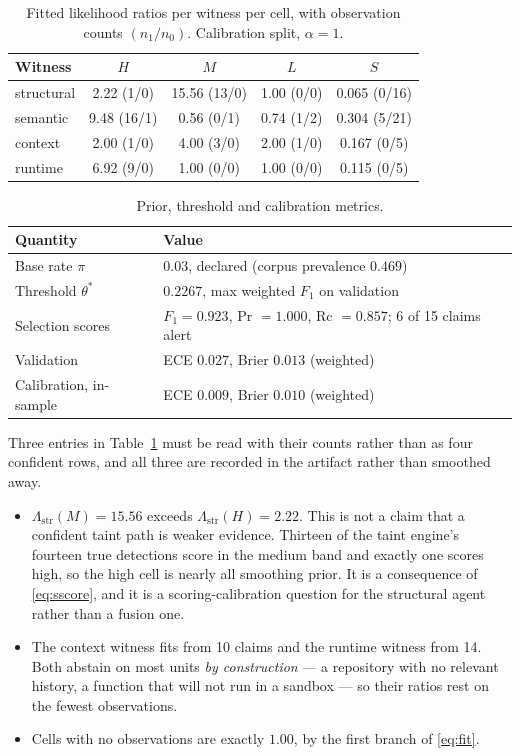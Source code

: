 \documentclass[conference]{IEEEtran}
\newcommand{\LR}{\Lambda}
\begin{document}
\begin{table}[t]
\caption{Fitted likelihood ratios per witness per cell, with observation counts
$(n_1/n_0)$. Calibration split, $\alpha=1$.}
\label{tab:ratios}
\centering
\small
\begin{tabular}{lcccc}
\toprule
Witness & $H$ & $M$ & $L$ & $S$ \\
\midrule
structural & 2.22 \tiny(1/0)  & 15.56 \tiny(13/0) & 1.00 \tiny(0/0) & 0.065 \tiny(0/16) \\
semantic   & 9.48 \tiny(16/1) & 0.56 \tiny(0/1)   & 0.74 \tiny(1/2) & 0.304 \tiny(5/21) \\
context    & 2.00 \tiny(1/0)  & 4.00 \tiny(3/0)   & 2.00 \tiny(1/0) & 0.167 \tiny(0/5)  \\
runtime    & 6.92 \tiny(9/0)  & 1.00 \tiny(0/0)   & 1.00 \tiny(0/0) & 0.115 \tiny(0/5)  \\
\bottomrule
\end{tabular}
\end{table}

\begin{table}[t]
\caption{Prior, threshold and calibration metrics.}
\label{tab:sel}
\centering
\small
\begin{tabular}{lp{2.05in}}
\toprule
Quantity & Value \\
\midrule
Base rate $\pi$        & $0.03$, declared (corpus prevalence $0.469$) \\
Threshold $\theta^{*}$ & $0.2267$, max weighted $F_1$ on validation \\
Selection scores       & $F_1=0.923$, Pr $=1.000$, Rc $=0.857$; 6 of 15 claims alert \\
Validation             & ECE $0.027$, Brier $0.013$ (weighted) \\
Calibration, in-sample & ECE $0.009$, Brier $0.010$ (weighted) \\
\bottomrule
\end{tabular}
\end{table}

Three entries in Table~\ref{tab:ratios} must be read with their counts rather than as four
confident rows, and all three are recorded in the artifact rather than smoothed away.

\begin{itemize}
\item $\LR_{\mathrm{str}}(M)=15.56$ exceeds $\LR_{\mathrm{str}}(H)=2.22$. This is not a claim
that a confident taint path is weaker evidence. Thirteen of the taint engine's fourteen true
detections score in the medium band and exactly one scores high, so the high cell is nearly
all smoothing prior. It is a consequence of \eqref{eq:sscore}, and it is a scoring-calibration
question for the structural agent rather than a fusion one.
\item The context witness fits from 10 claims and the runtime witness from 14. Both abstain on
most units \emph{by construction} --- a repository with no relevant history, a function that
will not run in a sandbox --- so their ratios rest on the fewest observations.
\item Cells with no observations are exactly $1.00$, by the first branch of \eqref{eq:fit}.
\end{itemize}
\end{document}
